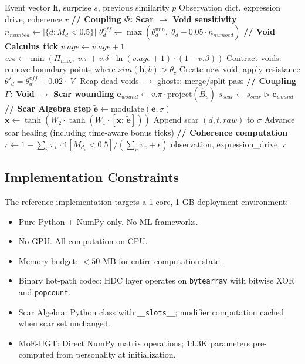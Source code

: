\documentclass[11pt]{article}
\begin{document}
\begin{algorithm}[H]
\caption{Void-Scar Engine: Single Event Processing}
\label{alg:pipeline}
\begin{algorithmic}[1]
\REQUIRE Event vector $\mathbf{h}$, surprise $s$, previous similarity $p$
\ENSURE Observation dict, expression drive, coherence $r$
\STATE \textbf{// Coupling $\Phi$: Scar $\to$ Void sensitivity}
\STATE $n_{numbed} \leftarrow |\{d : M_d < 0.5\}|$
\STATE $\theta_d^{eff} \leftarrow \max(\theta_d^{\min},\; \theta_d - 0.05 \cdot n_{numbed})$
\STATE \textbf{// Void Calculus tick}
  \STATE $v.age \leftarrow v.age + 1$
  \STATE $v.\pi \leftarrow \min(\Pi_{\max},\; v.\pi + v.\delta \cdot \ln(v.age + 1) \cdot (1 - v.\beta))$
\ENDFOR
\STATE Contract voids: remove boundary points where $sim(\mathbf{h}, b) > \theta_c$
  \STATE Create new void; apply resistance $\theta'_d = \theta_d^{eff} + 0.02 \cdot |V|$
\ENDIF
\STATE Reap dead voids $\to$ ghosts; merge/split pass
\STATE \textbf{// Coupling $\Gamma$: Void $\to$ Scar wounding}
  \STATE $\mathbf{e}_{wound} \leftarrow v.\pi \cdot \text{project}(\hat{B}_v)$
  \STATE $s_{scar} \leftarrow s_{scar} \triangleright \mathbf{e}_{wound}$
\ENDFOR
\STATE \textbf{// Scar Algebra step}
\STATE $\tilde{\mathbf{e}} \leftarrow \text{modulate}(\mathbf{e}, \sigma)$ 
\STATE $\mathbf{x} \leftarrow \tanh(W_2 \cdot \tanh(W_1 \cdot [\mathbf{x};\, \tilde{\mathbf{e}}]))$ 
  \STATE Append scar $(d, t, raw)$ to $\sigma$
\ENDIF
\STATE Advance scar healing (including time-aware bonus ticks)
\STATE \textbf{// Coherence computation}
\STATE $r \leftarrow 1 - \sum_v \pi_v \cdot \mathbb{1}[M_{d_v} < 0.5] / (\sum_v \pi_v + \epsilon)$
\RETURN observation, expression\_drive, $r$
\end{algorithmic}
\end{algorithm}

\subsection{Implementation Constraints}

The reference implementation targets a 1-core, 1-GB deployment environment:
\begin{itemize}
\item Pure Python + NumPy only. No ML frameworks.
\item No GPU. All computation on CPU.
\item Memory budget: $< 50$ MB for entire computation state.
\item Binary hot-path codec: HDC layer operates on \texttt{bytearray} with bitwise XOR and \texttt{popcount}.
\item Scar Algebra: Python class with \texttt{\_\_slots\_\_}; modifier computation cached when scar set unchanged.
\item MoE-HGT: Direct NumPy matrix operations; 14.3K parameters pre-computed from personality at initialization.
\end{itemize}
\end{document}

